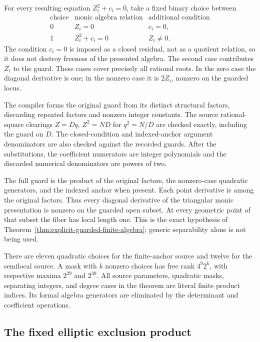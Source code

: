 \documentclass[11pt]{article}
\theoremstyle{definition}
\begin{document}
For every resulting equation $Z_i^2+c_i=0$, take a fixed binary
choice between
\[
 \begin{array}{c|c|c}
 \text{choice}&\text{monic algebra relation}&\text{additional condition}\\ \hline
 0&Z_i=0&c_i=0,\\
 1&Z_i^2+c_i=0&Z_i\ne0.
 \end{array}
\]
The condition $c_i=0$ is imposed as a closed residual, not as a
quotient relation, so it does not destroy freeness of the
presented algebra.  The second case contributes $Z_i$ to the
guard.  These cases cover precisely all rational roots.  In the
zero case the diagonal derivative is one; in the nonzero case it
is $2Z_i$, nonzero on the guarded locus.

The compiler forms the original guard from its distinct
structural factors, discarding repeated factors and nonzero
integer constants.  The source rational-square clearings $Z=Dq$,
$Z^2=ND$ for $q^2=N/D$ are checked exactly, including the
guard on $D$.  The closed-condition and indexed-anchor argument
denominators are also checked against the recorded guards.
After the substitutions, the
coefficient numerators are integer polynomials and the discarded
numerical denominators are powers of two.

The full guard is the product of the original factors, the
nonzero-case quadratic generators, and the indexed anchor when
present.  Each point derivative is among the original factors.
Thus every diagonal derivative of the triangular monic
presentation is nonzero on the guarded open subset.  At every
geometric point of that subset the fiber has local length one.
This is the exact hypothesis of
Theorem~\ref{thm:explicit-guarded-finite-algebra}; generic
separability alone is not being used.

There are eleven quadratic choices for the finite-anchor source
and twelve for the semilocal source.  A mask with $k$ nonzero
choices has free rank $4^9 2^k$, with respective maxima $2^{29}$
and $2^{30}$.  All source parameters, quadratic masks, separating
integers, and degree cases in the theorem are literal finite
product indices.  Its formal algebra generators are eliminated
by the determinant and coefficient operations.

\subsection{The fixed elliptic exclusion product}
\end{document}

